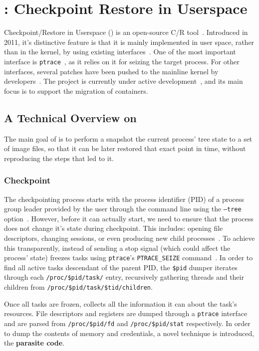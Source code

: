 \section{\criu: Checkpoint Restore in Userspace} \label{sec:bg-criu}

Checkpoint/Restore in Userspace (\criu) is an open-source C/R tool~\cite{criu-main-page}.
Introduced in 2011, it's distinctive feature is that it is mainly implemented in user space, rather than in the kernel, by using existing interfaces~\cite{Reber2016}.
One of the most important interface is \texttt{ptrace}~\cite{ptrace-manpage}, as it relies on it for seizing the target process.
For other interfaces, several patches have been pushed to the mainline kernel by \criu developers~\cite{criu-kernel-patches}.
The project is currently under active development~\cite{criu-github}, and its main focus is to support the migration of containers.

\subsection{A Technical Overview on \criu}

The main goal of \criu is to perform a snapshot the current process' tree state to a set of image files, so that it can be later restored that exact point in time, without reproducing the steps that led to it.

\subsubsection*{Checkpoint}

The checkpointing process starts with the process identifier (PID) of a process group leader provided by the user through the command line using the \texttt{--tree} option~\cite{criu-checkpoint}.
However, before it can actually start, we need to ensure that the process does not change it's state during checkpoint.
This includes: opening file descriptors, changing sessions, or even producing new child processes~\cite{criu-freeze}.
To achieve this transparently, instead of sending a stop signal (which could affect the process' state) \criu freezes tasks using \texttt{ptrace}'s \texttt{PTRACE\_SEIZE} command~\cite{ptrace-manpage}.
In order to find all active tasks descendant of the parent PID, the \texttt{\$pid} dumper iterates through each \texttt{/proc/\$pid/task/} entry, recursively gathering threads and their children from \texttt{/proc/\$pid/task/\$tid/children}.

Once all tasks are frozen, \criu collects all the information it can about the task's resources.
File descriptors and registers are dumped through a \texttt{ptrace} interface and are parsed from \texttt{/proc/\$pid/fd} and \texttt{/proc/\$pid/stat} respectively.
In order to dump the contents of memory and credentials, a novel technique is introduced, the \textbf{parasite code}.

